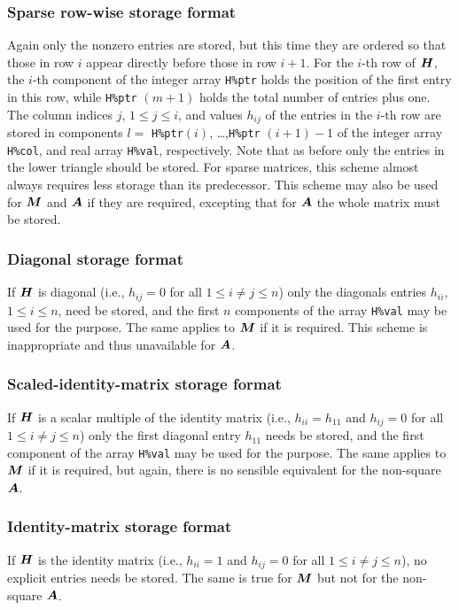 \documentclass{galahad}
\begin{document}
\subsubsection{Sparse row-wise storage format}\label{rowwise}
Again only the nonzero entries are stored, but this time
they are ordered so that those in row $i$ appear directly before those
in row $i+1$. For the $i$-th row of ${\bm{H}}$, the $i$-th component of the
integer array {\tt H\%ptr} holds the position of the first entry in this row,
while {\tt H\%ptr} $(m+1)$ holds the total number of entries plus one.
The column indices $j$, $1 \leq j \leq i$, and values $h_{ij}$ of the
entries in the $i$-th row are stored in components
$l =$ {\tt H\%ptr}$(i)$, \ldots ,{\tt H\%ptr} $(i+1)-1$ of the
integer array {\tt H\%col}, and real array {\tt H\%val}, respectively.
Note that as before only the entries in the lower triangle should be stored.
For sparse matrices, this scheme almost always requires less storage than
its predecessor.
This scheme may also be used for ${\bm{M}}$ and ${\bm{A}}$ if they are required,
excepting that for ${\bm{A}}$ the whole matrix must be stored.

\subsubsection{Diagonal storage format}\label{diagonal}
If ${\bm{H}}$ is diagonal (i.e., $h_{ij} = 0$ for all $1 \leq i \neq j \leq n$)
only the diagonals entries $h_{ii}$, $1 \leq i \leq n$,  need be stored,
and the first $n$ components of the array {\tt H\%val} may be used for
the purpose. The same applies to ${\bm{M}}$ if it is required.
This scheme is inappropriate and thus unavailable for ${\bm{A}}$.

\subsubsection{Scaled-identity-matrix storage format}\label{scaled-identity}
If ${\bm{H}}$ is a scalar multiple of the identity matrix
(i.e., $h_{ii} = h_{11}$  and $h_{ij} = 0$ for all $1 \leq i \neq j \leq n$)
only the first diagonal entry $h_{11}$ needs be stored,
and the first component of the array {\tt H\%val} may be used for
the purpose. The same applies to ${\bm{M}}$ if it is required, but again, 
there is no sensible equivalent for the non-square ${\bm{A}}$.

\subsubsection{Identity-matrix storage format}\label{identity}
If ${\bm{H}}$ is the identity matrix
(i.e., $h_{ii} = 1$ and $h_{ij} = 0$ for all $1 \leq i \neq j \leq n$),
no explicit entries needs be stored. The same is true for ${\bm{M}}$ but
not for the non-square ${\bm{A}}$.
\end{document}
